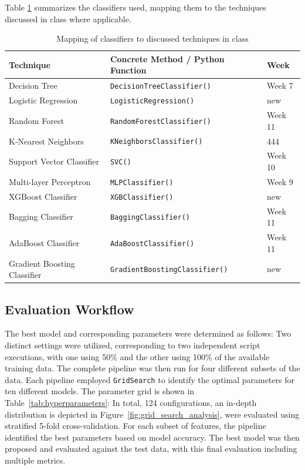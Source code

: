 Table \ref{tab:classifiers} summarizes the classifiers used, mapping them to the techniques discussed in class where applicable.
\begin{table}[h!]
    \centering
    \begin{tabular}{lll}
    \hline
    \textbf{Technique}          & \textbf{Concrete Method / Python Function} & \textbf{Week} \\
    \hline
    Decision Tree               & \texttt{DecisionTreeClassifier()}           & Week 7        \\
    Logistic Regression         & \texttt{LogisticRegression()}               & new           \\
    Random Forest               & \texttt{RandomForestClassifier()}            & Week 11       \\
    K-Nearest Neighbors         & \texttt{KNeighborsClassifier()}              & 444           \\
    Support Vector Classifier   & \texttt{SVC()}                               & Week 10       \\
    Multi-layer Perceptron      & \texttt{MLPClassifier()}                     & Week 9        \\
    XGBoost Classifier          & \texttt{XGBClassifier()}                     & new           \\
    Bagging Classifier          & \texttt{BaggingClassifier()}                 & Week 11       \\
    AdaBoost Classifier         & \texttt{AdaBoostClassifier()}                & Week 11       \\
    Gradient Boosting Classifier & \texttt{GradientBoostingClassifier()}        & new           \\
    \hline
    \end{tabular}
    \caption{Mapping of classifiers to discussed techniques in class}
    \label{tab:classifiers}
\end{table}


\subsection{Evaluation Workflow}
The best model and corresponding parameters were determined as follows: Two distinct settings were utilized, corresponding to two independent script executions, with one using 50\% and the other using 100\% of the available training data. The complete pipeline was then run for four different subsets of the data. Each pipeline employed \texttt{GridSearch} to identify the optimal parameters for ten different models. The parameter grid is shown in Table~\ref{tab:hyperparameters}: In total, 124 configurations, an in-depth distribution is depicted in Figure~\ref{fig:grid_search_analysis}, were evaluated using stratified 5-fold cross-validation. For each subset of features, the pipeline identified the best parameters based on model accuracy. The best model was then proposed and evaluated against the test data, with this final evaluation including multiple metrics.


